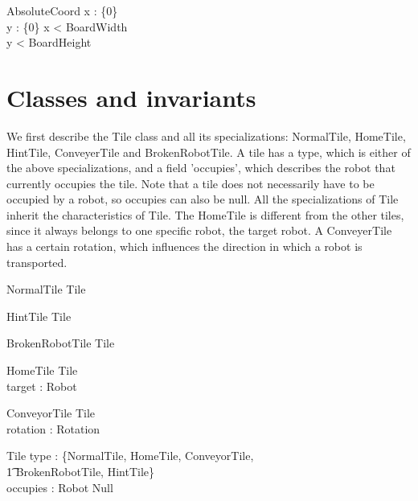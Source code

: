 \documentclass[12pt]{article}
\begin{document}
\begin{schema}{AbsoluteCoord}
x : \nat \cup \{0\} \\
y : \nat \cup \{0\}
\where
x < BoardWidth \\
y < BoardHeight
\end{schema}


\section{Classes and invariants}
We first describe the Tile class and all its specializations: NormalTile, HomeTile, HintTile, ConveyerTile and BrokenRobotTile. A tile has a type, which is either of the above specializations, and a field 'occupies', which describes the robot that currently occupies the tile. Note that a tile does not necessarily have to be occupied by a robot, so occupies can also be null. All the specializations of Tile inherit the characteristics of Tile. The HomeTile is different from the other tiles, since it always belongs to one specific robot, the target robot. A ConveyerTile has a certain rotation, which influences the direction in which a robot is transported.

\begin{schema}{NormalTile}
Tile
\end{schema}

\begin{schema}{HintTile}
Tile
\end{schema}

\begin{schema}{BrokenRobotTile}
Tile
\end{schema}

\begin{schema}{HomeTile}
Tile \\
target : Robot
\end{schema}

\begin{schema}{ConveyorTile}
Tile \\
rotation : Rotation
\end{schema}

\begin{schema}{Tile}
type : \{NormalTile, HomeTile, ConveyorTile, \\ \t1 BrokenRobotTile, HintTile\} \\
occupies : Robot \cup Null
\end{schema}
\end{document}
